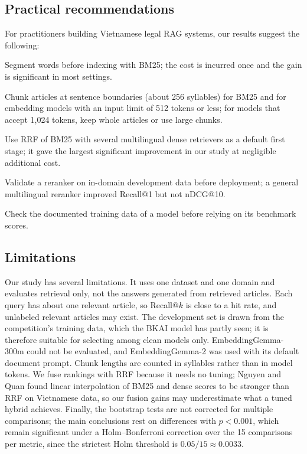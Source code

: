 \documentclass{ws-vjcs}
\begin{document}
\subsection{Practical recommendations}

For practitioners building Vietnamese legal RAG systems, our results suggest the following:
\begin{alphlist}[(a)]
\item Segment words before indexing with BM25; the cost is incurred once and the gain is significant in most settings.
\item Chunk articles at sentence boundaries (about 256 syllables) for BM25 and for embedding models with an input limit of 512 tokens or less; for models that accept 1,024 tokens, keep whole articles or use large chunks.
\item Use RRF of BM25 with several multilingual dense retrievers as a default first stage; it gave the largest significant improvement in our study at negligible additional cost.
\item Validate a reranker on in-domain development data before deployment; a general multilingual reranker improved Recall@1 but not nDCG@10.
\item Check the documented training data of a model before relying on its benchmark scores.
\end{alphlist}

\subsection{Limitations}

Our study has several limitations. It uses one dataset and one domain and evaluates retrieval only, not the answers generated from retrieved articles. Each query has about one relevant article, so Recall@$k$ is close to a hit rate, and unlabeled relevant articles may exist. The development set is drawn from the competition's training data, which the BKAI model has partly seen; it is therefore suitable for selecting among clean models only. EmbeddingGemma-300m could not be evaluated, and EmbeddingGemma-2 was used with its default document prompt. Chunk lengths are counted in syllables rather than in model tokens. We fuse rankings with RRF because it needs no tuning; Nguyen and Quan\cite{nguyen2026vire} found linear interpolation of BM25 and dense scores to be stronger than RRF on Vietnamese data, so our fusion gains may underestimate what a tuned hybrid achieves. Finally, the bootstrap tests are not corrected for multiple comparisons; the main conclusions rest on differences with $p < 0.001$, which remain significant under a Holm--Bonferroni correction over the 15 comparisons per metric, since the strictest Holm threshold is $0.05/15 \approx 0.0033$.
\end{document}

